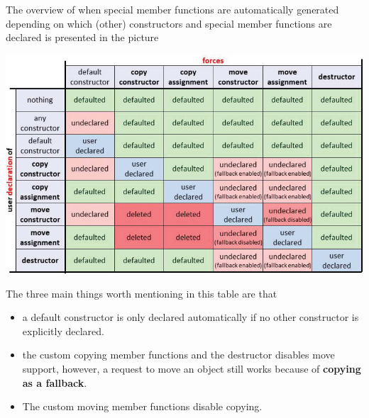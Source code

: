 \documentclass[../main]{subfiles}
\begin{document}
    The overview of when special member functions are automatically generated depending on which (other) constructors and special member functions are declared is presented
in the picture
\begin{center}
    \includegraphics[scale=0.5]{Pictures/specials.png}
\end{center}
\noindent
    The three main things worth mentioning in this table are that
    \begin{itemize}
        \item a default constructor is only declared automatically if no other constructor is explicitly declared.
        \item the custom copying member functions and the destructor disables move support, however, a request to move an object still works because of \textbf{copying as a fallback}.
        \item The custom moving member functions disable copying.
    \end{itemize}
\end{document}
